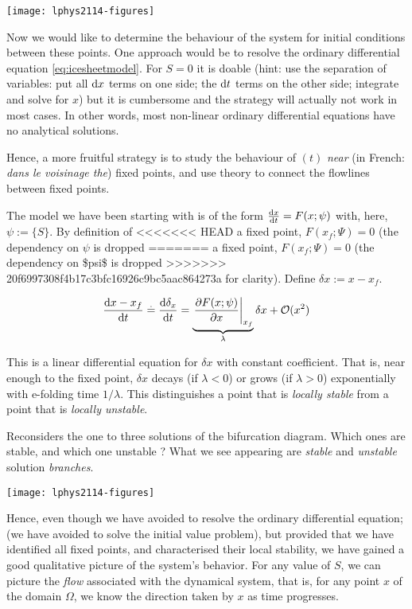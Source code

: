 \texttt{[image: lphys2114-figures]}

Now we would like to determine the behaviour of the system for initial
conditions between these points. One approach would be to resolve the
ordinary differential equation \eqref{eq:icesheetmodel}. For \(S=0\) it
is doable (hint: use the separation of variables: put all \(\mathop{}\!\mathrm{d} x\)
terms on one side; the \(\mathop{}\!\mathrm{d} t\) terms on the other side; integrate and
solve for \(x\)) but it is cumbersome and the strategy will actually not
work in most cases. In other words, most non-linear ordinary
differential equations have no analytical solutions.

Hence, a more fruitful strategy is to study the behaviour of \((t)\)
\emph{near} (in French: \emph{dans le voisinage the}) fixed points, and
use theory to connect the flowlines between fixed points.

The model we have been starting with is of the form
\(\ddt x = F (x;\psi)\) with, here, \(\psi := \{S\}\). By definition of
<<<<<<< HEAD
a fixed point, \(F(x_f;\Psi)=0\) (the dependency on \(\psi\) is dropped
=======
a fixed point, \(F(x_f;\Psi)=0\) (the dependency on \$psi\$ is dropped
>>>>>>> 20f6997308f4b17c3bfc16926c9bc5aac864273a
for clarity). Define \(\delta x := x-x_f\).

\begin{equation}
\ddt {x-x_f} \eqbdef \ddt {\delta_x} = \underbrace {\left.\pd{F(x;\psi)}{x}\right|_{x_f}}_{\lambda}  \delta x + \mathcal{O}(x^2)
\end{equation}

This is a linear differential equation for \(\delta x\) with constant
coefficient. That is, near enough to the fixed point, \(\delta x\)
decays (if \(\lambda < 0\)) or grows (if \(\lambda > 0\)) exponentially
with e-folding time \(1/\lambda\). This distinguishes a point that is
\emph{locally stable} from a point that is \emph{locally unstable}.

\bcd
Reconsiders the one to three solutions of the bifurcation diagram. Which
ones are stable, and which one unstable ? What we see appearing are
\emph{stable} and \emph{unstable} solution \emph{branches}. \ecd 

\texttt{[image: lphys2114-figures]}

Hence, even though we have avoided to resolve the ordinary differential
equation; (we have avoided to solve the initial value problem), but
provided that we have identified all fixed points, and characterised
their local stability, we have gained a good qualitative picture of the
system's behavior. For any value of \(S\), we can picture the
\emph{flow} associated with the dynamical system, that is, for any point
\(x\) of the domain \(\Omega\), we know the direction taken by \(x\) as
time progresses.

